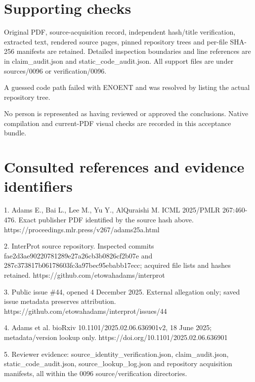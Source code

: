 \documentclass[10pt]{article}
\begin{document}
\section*{Supporting checks}
Original PDF, source-acquisition record, independent hash/title verification, extracted text, rendered source pages, pinned repository trees and per-file SHA-256 manifests are retained. Detailed inspection boundaries and line references are in claim\_audit.json and static\_code\_audit.json. All support files are under sources/0096 or verification/0096.\par
A guessed code path failed with ENOENT and was resolved by listing the actual repository tree.\par
No person is represented as having reviewed or approved the conclusions. Native compilation and current-PDF visual checks are recorded in this acceptance bundle.\par
\section*{Consulted references and evidence identifiers}
1. Adams E., Bai L., Lee M., Yu Y., AlQuraishi M. ICML 2025/PMLR 267:460-476. Exact publisher PDF identified by the source hash above. https://proceedings.mlr.press/v267/adams25a.html\par
2. InterProt source repository. Inspected commits fae2d3ae90220781289e27a26cb3b0826cf2b07e and 287c373817b06178603fc3a97bec95ebabb17ecc; acquired file lists and hashes retained. https://github.com/etowahadams/interprot\par
3. Public issue \#44, opened 4 December 2025. External allegation only; saved issue metadata preserves attribution. https://github.com/etowahadams/interprot/issues/44\par
4. Adams et al. bioRxiv 10.1101/2025.02.06.636901v2, 18 June 2025; metadata/version lookup only. https://doi.org/10.1101/2025.02.06.636901\par
5. Reviewer evidence: source\_identity\_verification.json, claim\_audit.json, static\_code\_audit.json, source\_lookup\_log.json and repository acquisition manifests, all within the 0096 source/verification directories.\par
\end{document}
